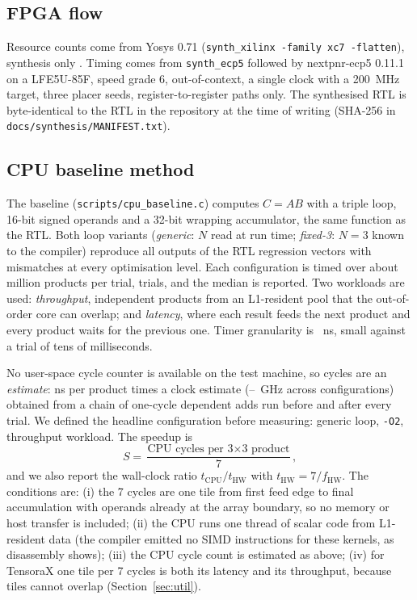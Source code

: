 \documentclass[conference]{IEEEtran}
\newcommand{\tx}{TensoraX\xspace}
\begin{document}
\subsection{FPGA flow}
Resource counts come from Yosys 0.71 (\texttt{synth\_xilinx -family xc7 -flatten}), synthesis only \cite{yosys}. Timing comes from \texttt{synth\_ecp5} followed by nextpnr-ecp5 0.11.1 \cite{nextpnr} on a LFE5U-85F, speed grade 6, out-of-context, a single clock with a 200~MHz target, three placer seeds, register-to-register paths only. The synthesised RTL is byte-identical to the RTL in the repository at the time of writing (SHA-256 in \texttt{docs/synthesis/MANIFEST.txt}).

\subsection{CPU baseline method}
\label{sec:method}
The baseline (\texttt{scripts/cpu\_baseline.c}) computes $C=AB$ with a triple loop, 16-bit signed operands and a 32-bit wrapping accumulator, the same function as the RTL. Both loop variants (\emph{generic}: $N$ read at run time; \emph{fixed-3}: $N=3$ known to the compiler) reproduce all \VecOutputs outputs of the \VecRecords RTL regression vectors with \VecMismatches mismatches at every optimisation level. Each configuration is timed over about \MatmulsPerTrialM million products per trial, \Trials trials, and the median is reported. Two workloads are used: \emph{throughput}, independent products from an L1-resident pool that the out-of-order core can overlap; and \emph{latency}, where each result feeds the next product and every product waits for the previous one. Timer granularity is \TimerNs~ns, small against a trial of tens of milliseconds.

No user-space cycle counter is available on the test machine, so cycles are an \emph{estimate}: ns per product times a clock estimate (\GhzLo--\GhzHi~GHz across configurations) obtained from a chain of one-cycle dependent adds run before and after every trial. We defined the headline configuration before measuring: generic loop, \texttt{-O2}, throughput workload. The speedup is
\begin{equation}
S=\frac{\text{CPU cycles per 3$\times$3 product}}{7},
\end{equation}
and we also report the wall-clock ratio $t_\text{CPU}/t_\text{HW}$ with $t_\text{HW}=7/f_\text{HW}$. The conditions are: (i) the 7 cycles are one tile from first feed edge to final accumulation with operands already at the array boundary, so no memory or host transfer is included; (ii) the CPU runs one thread of scalar code from L1-resident data (the compiler emitted no SIMD instructions for these kernels, as disassembly shows); (iii) the CPU cycle count is estimated as above; (iv) for \tx one tile per 7 cycles is both its latency and its throughput, because tiles cannot overlap (Section~\ref{sec:util}).
\end{document}
